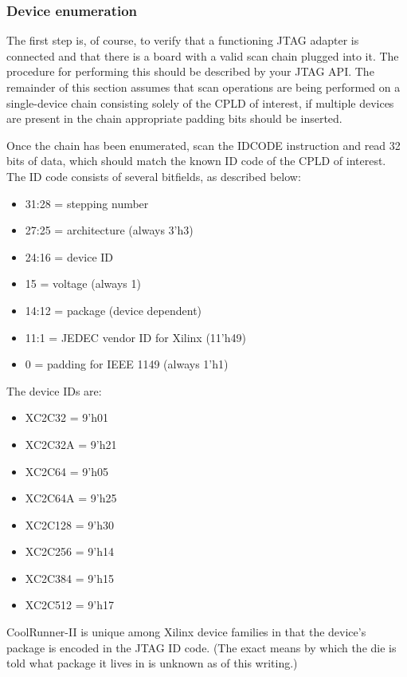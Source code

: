 \documentclass[pdftex,letterpaper]{article}
\begin{document}
\subsubsection{Device enumeration}

The first step is, of course, to verify that a functioning JTAG adapter is connected and that there is a board 
with a valid scan chain plugged into it. The procedure for performing this should be described by your JTAG API.
The remainder of this section assumes that scan operations are being performed on a single-device chain 
consisting solely of the CPLD of interest, if multiple devices are present in the chain appropriate padding bits 
should be inserted.

Once the chain has been enumerated, scan the IDCODE instruction and read 32 bits of data, which should match the 
known ID code of the CPLD of interest. The ID code consists of several bitfields, as described below:

\begin{itemize}
\item 31:28 = stepping number
\item 27:25 = architecture (always 3'h3)
\item 24:16 = device ID
\item 15 = voltage (always 1)
\item 14:12 = package (device dependent)
\item 11:1 = JEDEC vendor ID for Xilinx (11'h49)
\item 0	= padding for IEEE 1149 (always 1'h1)
\end{itemize}

The device IDs are:
\begin{itemize}
\item XC2C32 = 9'h01
\item XC2C32A = 9'h21
\item XC2C64 = 9'h05
\item XC2C64A = 9'h25
\item XC2C128 = 9'h30
\item XC2C256 = 9'h14
\item XC2C384 = 9'h15
\item XC2C512 = 9'h17
\end{itemize}

CoolRunner-II is unique among Xilinx device families in that the device's package is encoded in the JTAG ID code.
(The exact means by which the die is told what package it lives in is unknown as of this writing.) 
\end{document}
